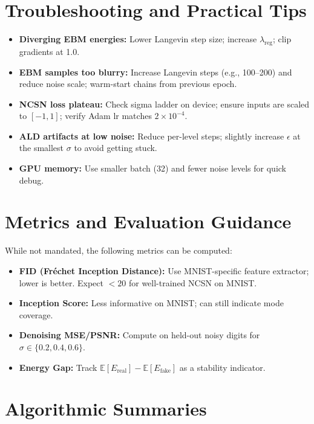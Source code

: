 \documentclass[a4paper,12pt]{article}
\begin{document}
\section{Troubleshooting and Practical Tips}
\begin{itemize}[leftmargin=*]
    \item \textbf{Diverging EBM energies:} Lower Langevin step size; increase $\lambda_{\text{reg}}$; clip gradients at 1.0.
    \item \textbf{EBM samples too blurry:} Increase Langevin steps (e.g., 100--200) and reduce noise scale; warm-start chains from previous epoch.
    \item \textbf{NCSN loss plateau:} Check sigma ladder on device; ensure inputs are scaled to $[-1,1]$; verify Adam lr matches $2\times 10^{-4}$.
    \item \textbf{ALD artifacts at low noise:} Reduce per-level steps; slightly increase $\epsilon$ at the smallest $\sigma$ to avoid getting stuck.
    \item \textbf{GPU memory:} Use smaller batch (32) and fewer noise levels for quick debug.
\end{itemize}

\section{Metrics and Evaluation Guidance}
While not mandated, the following metrics can be computed:
\begin{itemize}[leftmargin=*]
    \item \textbf{FID (Fréchet Inception Distance):} Use MNIST-specific feature extractor; lower is better. Expect $<20$ for well-trained NCSN on MNIST.
    \item \textbf{Inception Score:} Less informative on MNIST; can still indicate mode coverage.
    \item \textbf{Denoising MSE/PSNR:} Compute on held-out noisy digits for $\sigma \in \{0.2,0.4,0.6\}$.
    \item \textbf{Energy Gap:} Track $\mathbb{E}[E_{\text{real}}] - \mathbb{E}[E_{\text{fake}}]$ as a stability indicator.
\end{itemize}

\section{Algorithmic Summaries}
\end{document}
